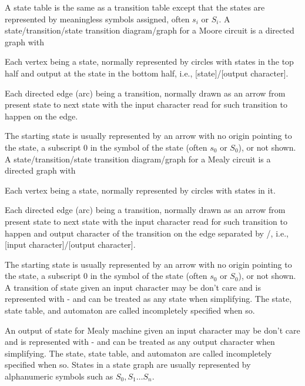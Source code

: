 \documentclass[a4paper,12pt]{report}
\begin{document}
A state table is the same as a transition table except that the states are represented by meaningless symbols assigned, often $s_i$ or $S_i$.
A state/transition/state transition diagram/graph for a Moore circuit is a directed graph with
\bit
\item Each vertex being a state, normally represented by circles with states in the top half and output at the state in the bottom half, i.e., [state]/[output character].
\item Each directed edge (arc) being a transition, normally drawn as an arrow from present state to next state with the input character read for such transition to happen on the edge.
\item The starting state is usually represented by an arrow with no origin pointing to the state, a subscript 0 in the symbol of the state (often $s_0$ or $S_0$), or not shown.
\eit
{}
A state/transition/state transition diagram/graph for a Mealy circuit is a directed graph with
\bit
\item Each vertex being a state, normally represented by circles with states in it.
\item Each directed edge (arc) being a transition, normally drawn as an arrow from present state to next state with the input character read for such transition to happen and output character of the transition on the edge separated by /, i.e., [input character]/[output character].
\item The starting state is usually represented by an arrow with no origin pointing to the state, a subscript 0 in the symbol of the state (often $s_0$ or $S_0$), or not shown.
\eit
{}
A transition of state given an input character may be don't care and is represented with - and can be treated as any state when simplifying. The state, state table, and automaton are called incompletely specified when so.

An output of state for Mealy machine given an input character may be don't care and is represented with - and can be treated as any output character when simplifying. The state, state table, and automaton are called incompletely specified when so.
States in a state graph are usually represented by alphanumeric symbols such as $S_0,S_1\ldots S_n$.
\end{document}
